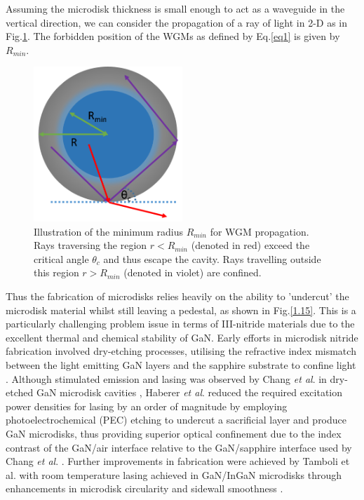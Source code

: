 Assuming the microdisk thickness is small enough to act as a waveguide in the vertical direction, we can consider the propagation of a ray of light in 2-D as in Fig.\ref{1.14}. The forbidden position of the WGMs as defined by Eq.\ref{eq1} is given by $R_{min}$.
\begin{figure}[h]
	\centering
	\includegraphics[width=0.5\textwidth]{Figs/Ch1/mdiskray.png}
	\caption {Illustration of the minimum radius $R_{min}$ for WGM propagation. Rays traversing the region $r<R_{min}$ (denoted in red) exceed the critical angle $\theta_{c}$ and thus escape the cavity. Rays travelling outside this region $r>R_{min}$ (denoted in violet) are confined.  }
	\label{1.14}
\end{figure}
\FloatBarrier 
Thus the fabrication of microdisks relies heavily on the ability to 'undercut' the microdisk material whilst still leaving a pedestal, as shown in Fig.\ref{1.15}. This is a particularly challenging problem issue in terms of III-nitride materials due to the excellent thermal and chemical stability of GaN.  Early efforts in microdisk nitride fabrication involved dry-etching processes, utilising the refractive index mismatch between the light emitting GaN layers and the sapphire substrate to confine light \cite{Tamboli2007}. Although stimulated emission and lasing was observed by Chang {\it et al}. in dry-etched GaN microdisk cavities \cite{Chang1999}, Haberer {\it et al}. \cite{Haberer2004} reduced the required excitation power densities for lasing by an order of magnitude by employing photoelectrochemical  (PEC) etching to undercut a sacrificial layer and produce GaN microdisks, thus providing superior optical confinement due to the index contrast of the GaN/air interface  relative to the GaN/sapphire interface used by Chang {\it et al}. \cite{Chang1999}. Further improvements in fabrication were achieved by Tamboli et al. with room temperature lasing achieved in GaN/InGaN microdisks through enhancements in microdisk circularity and sidewall smoothness \cite{Tamboli2007}. 
